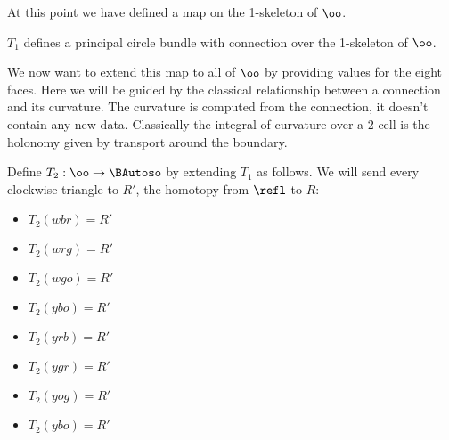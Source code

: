 At this point we have defined a map on the 1-skeleton of \(\oo\).

\begin{myclaim}
\( T_1 \) defines a principal circle bundle with connection over the 1-skeleton of \( \oo \).
\end{myclaim}

We now want to extend this map to all of \(\oo\) by providing values for
the eight faces. Here we will be guided by the classical relationship
between a connection and its curvature. The curvature is computed from
the connection, it doesn't contain any new data. Classically the
integral of curvature over a 2-cell is the holonomy given by transport
around the boundary.

\begin{mydef}
Define \( T_2:\oo\to\BAutoso \) by extending \( T_1 \) as follows. We will send every clockwise triangle to \( R' \), the homotopy from \( \refl \) to \( R \):
\begin{itemize}
\item \( T_2(wbr)=R' \) 
\item \( T_2(wrg)=R' \)
\item \( T_2(wgo)=R' \)
\item \( T_2(ybo)=R' \)
\item \( T_2(yrb)=R' \) 
\item \( T_2(ygr)=R' \)
\item \( T_2(yog)=R' \)
\item \( T_2(ybo)=R' \)
\end{itemize}
\end{mydef}
